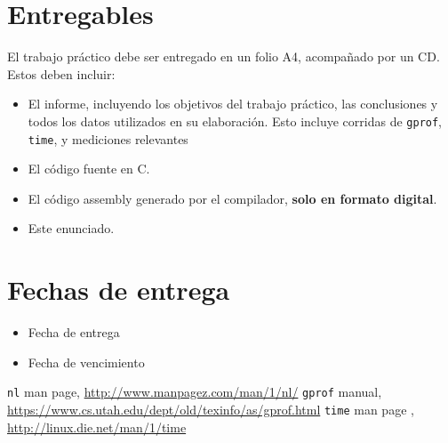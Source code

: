 \documentclass[9pt,a4paper]{article}
\newcommand{\gprof}{\texttt{gprof}}
\newcommand{\nl}{\texttt{nl}}
\newcommand{\unixtime}{\texttt{time}}
\begin{document}
\section{Entregables}
El trabajo práctico debe ser entregado en un folio A4, acompañado por un CD. Estos
deben incluir:
\begin{itemize}
\item El informe, incluyendo los objetivos del trabajo práctico, las conclusiones y todos los 
datos utilizados en su elaboración. Esto incluye corridas de \gprof, \unixtime, y mediciones relevantes
\item El código fuente en C.
\item El código assembly generado por el compilador, \textbf{solo en formato digital}.
\item Este enunciado.
\end{itemize}

\section{Fechas de entrega}
\begin{itemize}
\item Fecha de entrega
\item Fecha de vencimiento
\end{itemize}

\begin{thebibliography}{99}
\nl{} man page, \url{http://www.manpagez.com/man/1/nl/}
 \gprof{} manual, \url{https://www.cs.utah.edu/dept/old/texinfo/as/gprof.html}
 \unixtime{} man page  , \url{http://linux.die.net/man/1/time}
\end{thebibliography}
\end{document}
